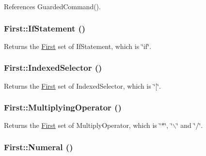 References GuardedCommand().

\hypertarget{classFirst_aa05d413f60b740bc9f594f76b51b0d6e}{
\subsubsection[{IfStatement}]{ First::IfStatement ()}}
\label{classFirst_aa05d413f60b740bc9f594f76b51b0d6e}


Returns the \hyperlink{classFirst}{First} set of IfStatement, which is \char`\"{}if\char`\"{}. 

\hypertarget{classFirst_a288f40e224fa2225533ad520baaa8575}{
\subsubsection[{IndexedSelector}]{ First::IndexedSelector ()}}
\label{classFirst_a288f40e224fa2225533ad520baaa8575}


Returns the \hyperlink{classFirst}{First} set of IndexedSelector, which is \char`\"{}\mbox{[}\char`\"{}. 

\hypertarget{classFirst_ae41a595e1322eb3995b70eddb276bb2a}{
\subsubsection[{MultiplyingOperator}]{ First::MultiplyingOperator ()}}
\label{classFirst_ae41a595e1322eb3995b70eddb276bb2a}


Returns the \hyperlink{classFirst}{First} set of MultiplyOperator, which is \char`\"{}$\ast$\char`\"{}, \char`\"{}$\backslash$\char`\"{} and \char`\"{}/\char`\"{}. 

\hypertarget{classFirst_aa0fa7fe6f11e3ead3307f35b6e29abaa}{
\subsubsection[{Numeral}]{ First::Numeral ()}}
\label{classFirst_aa0fa7fe6f11e3ead3307f35b6e29abaa}


